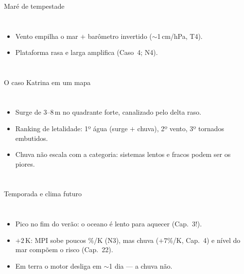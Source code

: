 \documentclass[aspectratio=169,11pt]{beamer}
\begin{document}
\begin{frame}{Maré de tempestade}
  \begin{columns}
    \vspace{0.4em}
    \begin{itemize}
      \item Vento empilha o mar $+$ barômetro invertido
            ($\sim$1\,cm/hPa, T4).
      \item Plataforma rasa e larga amplifica (Caso~4; N4).
    \end{itemize}
  \end{columns}
\end{frame}

\begin{frame}{O caso Katrina em um mapa}
  \begin{columns}
    \begin{itemize}
      \item Surge de 3--8\,m no quadrante forte, canalizado pelo
            delta raso.
      \item Ranking de letalidade: 1º água (surge $+$ chuva), 2º
            vento, 3º tornados embutidos.
      \item Chuva não escala com a categoria: sistemas lentos e
            fracos podem ser os piores.
    \end{itemize}
  \end{columns}
\end{frame}

\begin{frame}{Temporada e clima futuro}
  \begin{columns}
    \begin{itemize}
      \item Pico no fim do verão: o oceano é lento para aquecer
            (Cap.~3!).
      \item $+2$\,K: MPI sobe poucos \%/K (N3), mas chuva
            ($+7$\%/K, Cap.~4) e nível do mar compõem o risco
            (Cap.~22).
      \item Em terra o motor desliga em $\sim$1 dia — a chuva não.
    \end{itemize}
  \end{columns}
\end{frame}
\end{document}
